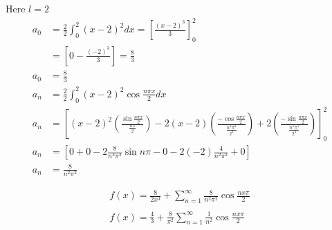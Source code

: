 \begin{enumerate}[label=\color{ocre}\textbf{\arabic*.}]
\begin{answer}
	Here $l=2$
	\begin{align*}
	a_{0}&=\frac{2}{2} \int_{0}^{2}(x-2)^{2} d x=\left[\frac{(x-2)^{3}}{3}\right]_{0}^{2}\\
	&=\left[0-\frac{(-2)^{3}}{3}\right]=\frac{8}{3} \\
	a_{0}&=\frac{8}{3}\\
	a_{n}&=\frac{2}{2} \int_{0}^{2}(x-2)^{2} \cos \frac{n \pi x}{2} d x \\
	a_{n}&=\left[(x-2)^{2}\left(\frac{\sin \frac{n \pi x}{2}}{\frac{n \pi}{2}}\right)-2(x-2)\left(\frac{-\cos \frac{n \pi x}{2}}{\frac{n^{2} \pi^{2}}{2^{2}}}\right)+2\left(\frac{-\sin \frac{n \pi x}{2}}{\frac{n^{3} \pi^{3}}{2^{3}}}\right)\right]_{0}^{2} \\
	a_{n}&=\left[0+0-2 \frac{8}{n^{3} \pi^{3}} \sin n \pi-0-2(-2) \frac{4}{n^{2} \pi^{2}}+0\right] \\
	a_{n}&=\frac{8}{n^{2} \pi^{2}}
	\end{align*}


	$$
	\begin{array}{l}
	f(x)=\frac{8}{2 x^3}+\sum_{n=1}^{\infty} \frac{8}{n^{2} \pi^{2}} \cos \frac{n x \pi}{2} \\\\
	f(x)=\frac{4}{3}+\frac{8}{\pi^{2}} \sum_{n=1}^{\infty} \frac{1}{n^{2}} \cos \frac{n x \pi}{2}
	\end{array}
	$$
\end{answer}
\end{enumerate}





